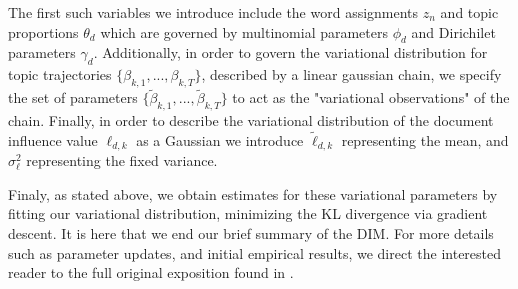 The first such variables we introduce include the word assignments $z_n$ and topic proportions $\theta_d$ which are governed by multinomial parameters $\phi_d$ and Dirichilet parameters $\gamma_d$. Additionally, in order to govern the variational distribution for topic trajectories $\{  \beta_{k,1},...,\beta_{k,T}  \}$, described by a linear gaussian chain, we specify the set of parameters $\{  \widetilde{\beta}_{k,1},...,\widetilde{\beta}_{k,T}  \}$ to act as the "variational observations" of the chain. Finally, in order to describe the variational distribution of the document influence value $\ell_{d,k}$ as a Gaussian we introduce $\widetilde{\ell}_{d,k}$ representing the mean, and $\sigma^2_{\ell}$ representing the fixed variance. 

Finaly, as stated above, we obtain estimates for these variational parameters by fitting our variational distribution, minimizing the KL divergence via gradient descent. It is here that we end our brief summary of the DIM. For more details such as parameter updates, and initial empirical results, we direct the interested reader to the full original exposition found in \parencite{icml2010_GerrishB10}.






















